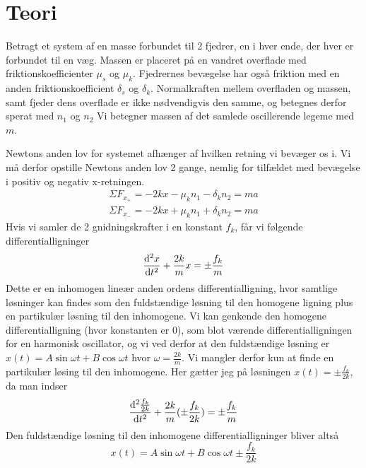 \chapter{Teori}
Betragt et system af en masse forbundet til 2 fjedrer, en i hver ende, der hver er forbundet til en væg. 
Massen er placeret på en vandret overflade med friktionskoefficienter $\mu_s$ og $\mu_k$. 
Fjedrernes bevægelse har også friktion med en anden friktionskoefficient $\delta_s$ og $\delta_k$. 
Normalkraften mellem overfladen og massen, samt fjeder dens overflade er ikke nødvendigvis den samme, og betegnes derfor sperat med $n_1$ og $n_2$
Vi betegner massen af det samlede oscillerende legeme med $m$. 

Newtons anden lov for systemet afhænger af hvilken retning vi bevæger os i. 
Vi må derfor opstille Newtons anden lov 2 gange, nemlig for tilfældet med bevægelse i positiv og negativ x-retningen.
\begin{align*}
    \Sigma F_{x_+} = -2kx - \mu_k n_1 - \delta_k n_2 = ma\\
    \Sigma F_{x_-} = -2kx + \mu_k n_1 + \delta_k n_2 = ma
\end{align*}
Hvis vi samler de 2 gnidningskrafter i en konstant $f_k$, får vi følgende differentialligninger
\begin{equation}
    \odv[order=2]{x}{t} + \frac{2k}{m}x = \pm \frac{f_k}{m}
\end{equation}
Dette er en inhomogen lineær anden ordens differentialligning, hvor samtlige løsninger kan findes 
som den fuldstændige løsning til den homogene ligning plus en partikulær løsning til den inhomogene.
Vi kan genkende den homogene differentialligning (hvor konstanten er 0), som blot værende differentialligningen for en harmonisk oscillator, 
og vi ved derfor at den fuldstændige løsning er $x(t) = A\sin\omega t + B\cos\omega t$ hvor $\omega = \frac{2k}{m}$. Vi mangler derfor kun at finde en partikulær løsing til den inhomogene.
Her gætter jeg på løsningen $x(t) = \pm \frac{f_k}{2k}$, da man indser
\[
     \odv[order=2]{\frac{f_k}{2k}}{t} + \frac{2k}{m}(\pm\frac{f_k}{2k}) = \pm \frac{f_k}{m}
\]
Den fuldstændige løsning til den inhomogene differentialligninger bliver altså
\begin{equation*}
    x(t) = A\sin\omega t + B\cos\omega t \pm \frac{f_k}{2k}
\end{equation*}
